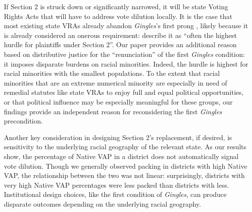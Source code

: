 \documentclass[12pt]{article}
\begin{document}
 If Section 2 is struck down or significantly narrowed, it will be state Voting Rights Acts that will have to address vote dilution locally.  It is the case that most existing state VRAs already abandon \textit{Gingles}'s first prong \cite{greenwood_stephanopoulos_2023}, likely because it is already considered an onerous requirement:
\cite{greenwood_stephanopoulos_2023} describe it as ``often the highest hurdle for plaintiffs under Section 2''. Our paper provides an additional reason based on distributive justice for the ``renunciation''\cite{greenwood_stephanopoulos_2023} of the first \textit{Gingles} condition: it imposes disparate burdens on racial minorities.  Indeed, the hurdle is highest for racial minorities with the smallest populations. To the extent that racial minorities that are an extreme numerical minority are especially in need of remedial statutes like state VRAs to enjoy full and equal political opportunities, or that political influence may be especially meaningful for these groups, our findings provide an independent reason for reconsidering the first \textit{Gingles} precondition.

Another key consideration in designing Section 2's replacement, if desired, is sensitivity to the underlying racial geography of the relevant state.  As our results show, the percentage of Native VAP in a district does not automatically signal vote dilution.  Though we generally observed packing in districts with high Native VAP, the relationship between the two was not linear: surprisingly, districts with very high Native VAP percentages were less packed than districts with less.  Institutional design choices, like the first condition of \textit{Gingles}, can produce disparate outcomes depending on the underlying racial geography.
\end{document}
